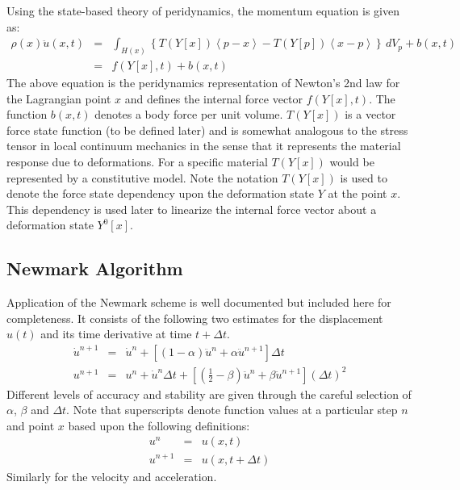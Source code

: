 \documentclass[pdf,ps2pdf,12pt]{SANDreport}
\begin{document}
Using the state-based theory of peridynamics, the momentum equation is given as:
\begin{eqnarray}
\rho(x) \ddot{u}(x,t) &=& \int_{H(x)} \left\lbrace T(Y[x])\left\langle p-x \right\rangle  - T(Y[p]) \left\langle x-p \right\rangle \right\rbrace \,dV_p+ b(x,t) \nonumber \\ 
&=& f(Y[x],t)+b(x,t)\label{eq:pdMomentum}
\end{eqnarray}
The above equation is the peridynamics representation of Newton's 2nd law for the Lagrangian point $x$ and defines the internal force vector $f(Y[x],t)$.    The function $b(x,t)$ denotes a body force per unit volume.  $T(Y[x])$ is a vector force state function (to be defined later) and is somewhat analogous to the stress tensor in local continuum mechanics in the sense that it represents the material response due to deformations.  For a specific material $T(Y[x])$ would be represented by a constitutive model.  Note the notation $T(Y[x])$ is used to denote the force state dependency upon the deformation state $Y$ at the point $x$.  This dependency is used later to linearize the internal force vector about a deformation state $Y^0[x]$.  
\subsection{Newmark Algorithm}
Application of the Newmark scheme is well documented \cite{ref:functionalAnalysis.jnReddy, ref:femBook.bathe} but included here for completeness.
It consists of the following two estimates for the displacement $u(t)$ and its time derivative at time $t+\Delta t$.  
\begin{eqnarray}
\dot{u}^{n+1} &=& \dot{u}^{n} + \left[(1-\alpha)\ddot{u}^{n}+\alpha \ddot{u}^{n+1}\right] \Delta t \nonumber \\
u^{n+1} &=& {u}^{n} + \dot{u}^n \Delta t + \left[(\frac{1}{2}-\beta)\ddot{u}^{n}+\beta \ddot{u}^{n+1}\right](\Delta t)^2 \label{eq:newmarkApproximation}
\end{eqnarray}
Different levels of accuracy and stability are given through the careful selection of $\alpha$, $\beta$ and $\Delta t$.  Note that superscripts denote function values at  a particular step $n$ and point $x$ based upon the following definitions: 
\begin{eqnarray}
u^{n}     &=&u(x,t) \nonumber \\
u^{n+1} &=&u(x,t+\Delta t) \nonumber 
\end{eqnarray}
Similarly for the velocity and acceleration.  
\end{document}
